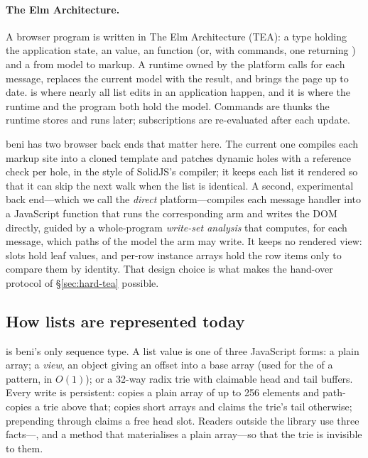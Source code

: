 \paragraph{The Elm Architecture.} A browser program is written in The Elm Architecture (TEA): a
 type holding the application state, an  value, an
 function (or, with commands, one returning
) and a  from model to markup. A runtime owned by the platform
calls  for each message, replaces the current model with the result, and brings the
page up to date.  is where nearly all list edits in an application happen, and it is
where the runtime and the program both hold the model. Commands are thunks the runtime stores and
runs later; subscriptions are re-evaluated after each update.

beni has two browser back ends that matter here. The current one compiles each markup site into a
cloned template and patches dynamic holes with a reference check per hole, in the style of
SolidJS's compiler; it keeps each list it rendered so that it can skip the next walk when the list
is identical. A second, experimental back end---which we call the \emph{direct} platform---compiles
each message handler into a JavaScript function that runs the corresponding  arm and
writes the DOM directly, guided by a whole-program \emph{write-set analysis} that computes, for each
message, which paths of the model the arm may write. It keeps no rendered view: slots hold leaf
values, and per-row instance arrays hold the row items only to compare them by identity. That
design choice is what makes the hand-over protocol of \S\ref{sec:hard-tea} possible.

\subsection{How lists are represented today}
\label{sec:bg-lists}

 is beni's only sequence type. A list value is one of three JavaScript forms: a plain
array; a \emph{view}, an object  giving an offset into a base array (used for
the  of a pattern, in $O(1)$); or a 32-way radix trie with claimable head and tail
buffers. Every write is persistent:  copies a plain array of up to 256 elements and
path-copies a trie above that;  copies short arrays and claims the trie's tail
otherwise; prepending through \code{[ x, …xs ]} claims a free head slot. Readers outside the
library use three facts---,  and a  method that
materialises a plain array---so that the trie is invisible to them.

